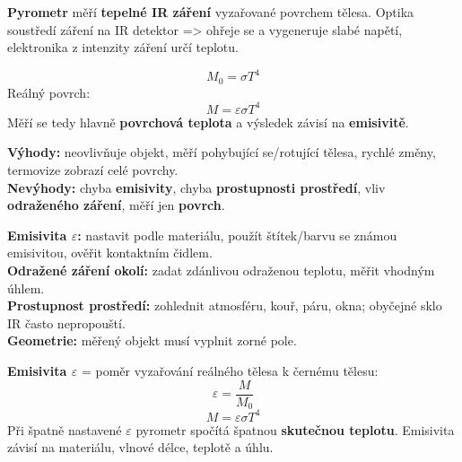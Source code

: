 \documentclass[12pt]{article}
\newcounter{chapternumber}
\newcounter{questionnumber}
\renewcommand{\thequestionnumber}{\arabic{chapternumber}.\arabic{questionnumber}}
\begin{document}
\begin{tcolorbox}[title={\stepcounter{questionnumber}\thequestionnumber. Jak funguje bezkontaktní teploměr – pyrometr? (14–17)}]
\textbf{Pyrometr} měří \textbf{tepelné IR záření} vyzařované povrchem tělesa. Optika soustředí záření na IR detektor => ohřeje se a vygeneruje slabé napětí, elektronika z intenzity záření určí teplotu.

\[
M_0=\sigma T^4
\]
Reálný povrch:
\[
M=\varepsilon\sigma T^4
\]
Měří se tedy hlavně \textbf{povrchová teplota} a výsledek závisí na \textbf{emisivitě}.
\end{tcolorbox}

\begin{tcolorbox}[title={\stepcounter{questionnumber}\thequestionnumber. Jaké jsou výhody a nevýhody bezkontaktního měření teploty? (14–15)}]
\textbf{Výhody:} neovlivňuje objekt, měří pohybující se/rotující tělesa, rychlé změny, termovize zobrazí celé povrchy.\\
\textbf{Nevýhody:} chyba \textbf{emisivity}, chyba \textbf{prostupnosti prostředí}, vliv \textbf{odraženého záření}, měří jen \textbf{povrch}.
\end{tcolorbox}

\begin{tcolorbox}[title={\stepcounter{questionnumber}\thequestionnumber. Co omezuje přesnost bezkontaktního senzoru teploty? Jak se tyto chyby dají potlačovat? (14–20)}]
\textbf{Emisivita $\varepsilon$:} nastavit podle materiálu, použít štítek/barvu se známou emisivitou, ověřit kontaktním čidlem.\\
\textbf{Odražené záření okolí:} zadat zdánlivou odraženou teplotu, měřit vhodným úhlem.\\
\textbf{Prostupnost prostředí:} zohlednit atmosféru, kouř, páru, okna; obyčejné sklo IR často nepropouští.\\
\textbf{Geometrie:} měřený objekt musí vyplnit zorné pole.
\end{tcolorbox}

\begin{tcolorbox}[title={\stepcounter{questionnumber}\thequestionnumber. Co je to emisivita, jak se uplatňuje při měření? (popis, příklad, rovnice) (18–20)}]
\textbf{Emisivita $\varepsilon$} = poměr vyzařování reálného tělesa k černému tělesu:
\[
\varepsilon=\frac{M}{M_0}
\]
\[
M=\varepsilon\sigma T^4
\]
Při špatně nastavené $\varepsilon$ pyrometr spočítá špatnou \textbf{skutečnou teplotu}. Emisivita závisí na materiálu, vlnové délce, teplotě a úhlu.
\end{tcolorbox}
\end{document}
